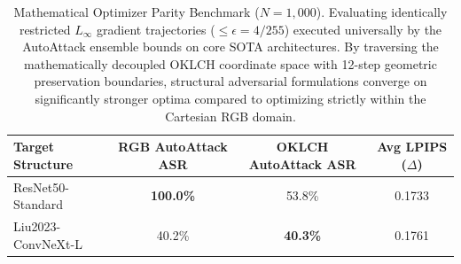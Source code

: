 \begin{table}[htbp]
\centering
\caption{Mathematical Optimizer Parity Benchmark ($N=1{,}000$). Evaluating identically restricted $L_{\infty}$ gradient trajectories ($\leq\epsilon=4/255$) executed universally by the AutoAttack ensemble bounds on core SOTA architectures. By traversing the mathematically decoupled OKLCH coordinate space with 12-step geometric preservation boundaries, structural adversarial formulations converge on significantly stronger optima compared to optimizing strictly within the Cartesian RGB domain.}
\label{tab:sota_optimizer_comparison}
\begin{tabular*}{\columnwidth}{@{\extracolsep{\fill}}lccc@{}}
\toprule
\textbf{Target Structure} & \textbf{RGB AutoAttack ASR} & \textbf{OKLCH AutoAttack ASR} & \textbf{Avg LPIPS ($\Delta$)} \\ \midrule
ResNet50-Standard & \textbf{100.0\%} & 53.8\% & 0.1733 \\
Liu2023-ConvNeXt-L & 40.2\% & \textbf{40.3\%} & 0.1761 \\
\bottomrule
\end{tabular*}
\end{table}
